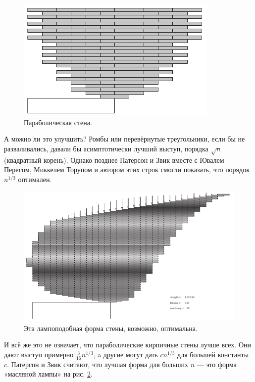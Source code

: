 \begin{figure}[htb!]
\centering
\includegraphics[scale=1]{pics/kirpich7}
\caption{Параболическая стена.}
\label{pic:kirpich7}
\end{figure}

А можно ли это улучшить?
Ромбы или перевёрнутые треугольники, если бы не разваливались, давали бы асимптотически лучший выступ, порядка $\sqrt{n}$ (квадратный корень).
Однако позднее Патерсон и Звик вместе с Ювалем Пересом, Миккелем Торупом и автором этих строк \cite{48} смогли показать, что порядок $n^{1/3}$ оптимален.

\begin{figure}[htb!]
\centering
\includegraphics[scale=1]{pics/kirpich8}
\caption{Эта лампоподобная форма стены, возможно, оптимальна.}
\label{pic:kirpich8}
\end{figure}

И всё же это не означает, что параболические кирпичные стены лучше всех.
Они дают выступ примерно $\tfrac3{16}n^{1/3}$, a другие могут дать $cn^{1/3}$ для большей константы $c$.
Патерсон и Звик считают, что лучшая форма для больших $n$ --- это форма «масляной лампы» на рис. \ref{pic:kirpich8}.

